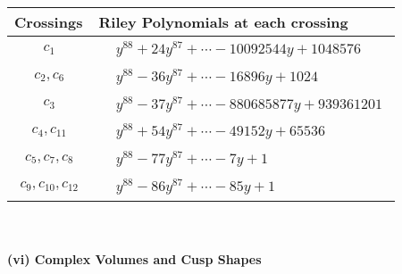 \documentclass[1p]{elsarticle_modified}
\theoremstyle{definition}
\begin{document}
\begin{tabular}{m{50pt}|m{274pt}}
Crossings & \hspace{64pt}Riley Polynomials at each crossing \\
\hline $$\begin{aligned}c_{1}\end{aligned}$$&$\begin{aligned}
&y^{88}+24 y^{87}+\cdots-10092544 y+1048576
\end{aligned}$\\
\hline $$\begin{aligned}c_{2},c_{6}\end{aligned}$$&$\begin{aligned}
&y^{88}-36 y^{87}+\cdots-16896 y+1024
\end{aligned}$\\
\hline $$\begin{aligned}c_{3}\end{aligned}$$&$\begin{aligned}
&y^{88}-37 y^{87}+\cdots-880685877 y+939361201
\end{aligned}$\\
\hline $$\begin{aligned}c_{4},c_{11}\end{aligned}$$&$\begin{aligned}
&y^{88}+54 y^{87}+\cdots-49152 y+65536
\end{aligned}$\\
\hline $$\begin{aligned}c_{5},c_{7},c_{8}\end{aligned}$$&$\begin{aligned}
&y^{88}-77 y^{87}+\cdots-7 y+1
\end{aligned}$\\
\hline $$\begin{aligned}c_{9},c_{10},c_{12}\end{aligned}$$&$\begin{aligned}
&y^{88}-86 y^{87}+\cdots-85 y+1
\end{aligned}$\\
\hline
\end{tabular}\\~\\
\newpage\flushleft \textbf{(vi) Complex Volumes and Cusp Shapes}
\end{document}
